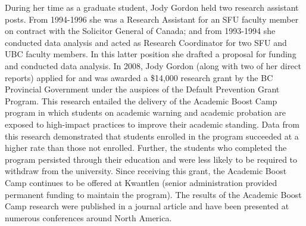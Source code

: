 \documentclass[letterpaper,10pt,headsepline]{scrreprt}
\begin{document}
During her time as a graduate student, Jody Gordon held two research assistant
posts. From 1994-1996 she was a Research Assistant for an SFU faculty member
on contract with the Solicitor General of Canada; and from 1993-1994 she
conducted data analysis and acted as Research Coordinator for two SFU and UBC
faculty members. In this latter position she drafted a proposal for funding
and conducted data analysis. In 2008, Jody Gordon (along with two of her
direct reports) applied for and was awarded a \$14,000 research grant by the
BC Provincial Government under the auspices of the Default Prevention Grant
Program. This research entailed the delivery of the Academic Boost Camp
program in which students on academic warning and academic probation are
exposed to high-impact practices to improve their academic standing. Data from
this research demonstrated that students enrolled in the program succeeded at
a higher rate than those not enrolled. Further, the students who completed the
program persisted through their education and were less likely to be required
to withdraw from the university. Since receiving this grant, the Academic
Boost Camp continues to be offered at Kwantlen (senior administration provided
permanent funding to maintain the program). The results of the Academic Boost
Camp research were published in a journal article and have been presented at
numerous conferences around North America.
\end{document}

